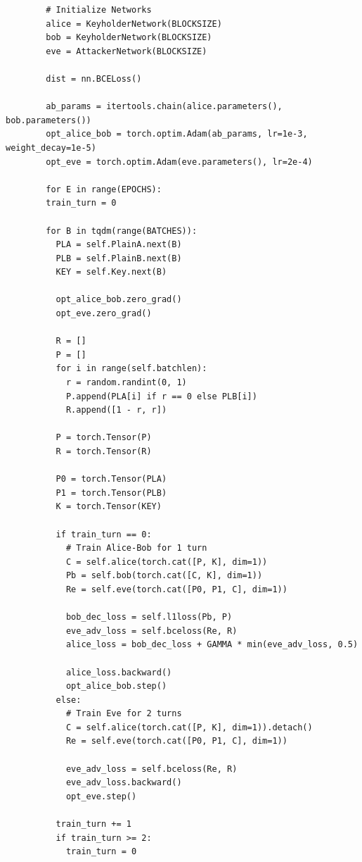 \documentclass[a4paper]{article}
\begin{document}
      \begin{lstlisting}
        # Initialize Networks
        alice = KeyholderNetwork(BLOCKSIZE)
        bob = KeyholderNetwork(BLOCKSIZE)
        eve = AttackerNetwork(BLOCKSIZE)
        
        dist = nn.BCELoss()

        ab_params = itertools.chain(alice.parameters(), bob.parameters())
        opt_alice_bob = torch.optim.Adam(ab_params, lr=1e-3, weight_decay=1e-5)
        opt_eve = torch.optim.Adam(eve.parameters(), lr=2e-4)

        for E in range(EPOCHS):  
        train_turn = 0
  
        for B in tqdm(range(BATCHES)):
          PLA = self.PlainA.next(B)
          PLB = self.PlainB.next(B)
          KEY = self.Key.next(B)
  
          opt_alice_bob.zero_grad()
          opt_eve.zero_grad()
  
          R = []
          P = []
          for i in range(self.batchlen):
            r = random.randint(0, 1)
            P.append(PLA[i] if r == 0 else PLB[i])
            R.append([1 - r, r])
  
          P = torch.Tensor(P)
          R = torch.Tensor(R)
  
          P0 = torch.Tensor(PLA)
          P1 = torch.Tensor(PLB)
          K = torch.Tensor(KEY)
                
          if train_turn == 0:
            # Train Alice-Bob for 1 turn
            C = self.alice(torch.cat([P, K], dim=1))
            Pb = self.bob(torch.cat([C, K], dim=1))
            Re = self.eve(torch.cat([P0, P1, C], dim=1))
  
            bob_dec_loss = self.l1loss(Pb, P)
            eve_adv_loss = self.bceloss(Re, R)
            alice_loss = bob_dec_loss + GAMMA * min(eve_adv_loss, 0.5)
            
            alice_loss.backward()
            opt_alice_bob.step()
          else:
            # Train Eve for 2 turns
            C = self.alice(torch.cat([P, K], dim=1)).detach()
            Re = self.eve(torch.cat([P0, P1, C], dim=1))
            
            eve_adv_loss = self.bceloss(Re, R)          
            eve_adv_loss.backward()
            opt_eve.step()
  
          train_turn += 1
          if train_turn >= 2:
            train_turn = 0
      \end{lstlisting}
\end{document}
